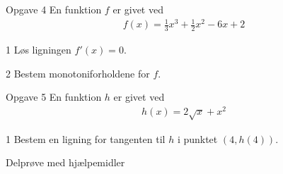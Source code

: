 \begin{opgavetekst}{Opgave 4}
	En funktion $f$ er givet ved
	\begin{align*}
		f(x) = \frac{1}{3}x^3 + \frac{1}{2}x^2 - 6x + 2
	\end{align*}
\end{opgavetekst}

\begin{delopgave}{}{1}
	Løs ligningen $f'(x) = 0$.
\end{delopgave}
\begin{delopgave}{}{2}
	Bestem monotoniforholdene for $f$. 
\end{delopgave}

\begin{opgavetekst}{Opgave 5}
	En funktion $h$ er givet ved
	\begin{align*}
		h(x) = 2\sqrt{x} + x^2
	\end{align*}
\end{opgavetekst}
\begin{delopgave}{}{1}
	Bestem en ligning for tangenten til $h$ i punktet $(4,h(4))$.
\end{delopgave}


\newpage

\begin{center}
\LARGE
Delprøve med hjælpemidler 
\end{center}

